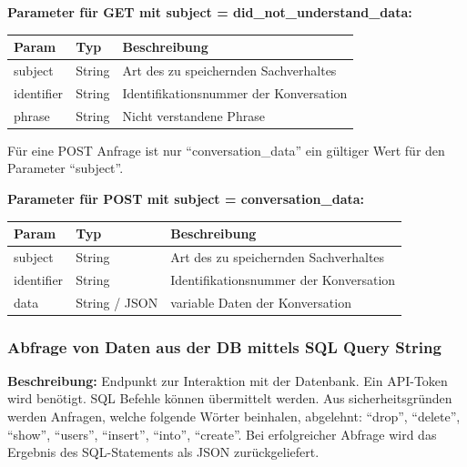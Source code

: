 \textbf{Parameter für GET mit subject = did\_not\_understand\_data:}
\begin{table}[H]
    \label{table:/docker-hbv-kms-http/collector4}
    \setlength{\tabcolsep}{3pt}
    \begin{tabular}{p{100pt}p{80pt}p{200pt}}
        \hline
        Param      & Typ    & Beschreibung                           \\
        \hline
        subject    & String & Art des zu speichernden Sachverhaltes  \\
        identifier & String & Identifikationsnummer der Konversation \\
        phrase     & String & Nicht verstandene Phrase               \\
        \hline
    \end{tabular}
\end{table}

Für eine POST Anfrage ist nur ``conversation\_data'' ein gültiger Wert für den Parameter ``subject''.

\textbf{Parameter für POST mit subject = conversation\_data:}
\begin{table}[H]
    \label{table:/docker-hbv-kms-http/collector5}
    \setlength{\tabcolsep}{3pt}
    \begin{tabular}{p{100pt}p{80pt}p{200pt}}
        \hline
        Param      & Typ           & Beschreibung                           \\
        \hline
        subject    & String        & Art des zu speichernden Sachverhaltes  \\
        identifier & String        & Identifikationsnummer der Konversation \\
        data       & String / JSON & variable Daten der Konversation        \\
        \hline
    \end{tabular}
\end{table}
\dotfill



\subsubsection{Abfrage von Daten aus der DB mittels SQL Query String}
\label{sec:api-sql-query}
\textbf{Beschreibung:} Endpunkt zur Interaktion mit der Datenbank. Ein API-Token wird benötigt. SQL Befehle können
übermittelt werden. Aus sicherheitsgründen werden Anfragen, welche folgende Wörter beinhalen, abgelehnt:
``drop'', ``delete'', ``show'', ``users'', ``insert'', ``into'', ``create''. Bei erfolgreicher
Abfrage wird das Ergebnis des SQL-Statements als JSON zurückgeliefert.


